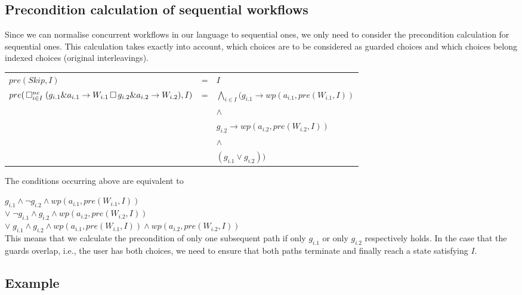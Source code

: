 \documentclass[11pt]{article}
\begin{document}
\subsection{Precondition calculation of sequential workflows}

Since we can normalise concurrent workflows in our language to sequential ones, we only need to consider the precondition calculation for sequential ones. This calculation takes exactly into account, which choices are to be considered as guarded choices and which choices belong indexed choices (original interleavings).

\noindent
\begin{tabular}{l c l}
	$pre(Skip,I)$ & = & $I$ \\
	$pre(\, \Box^{nc}_{i \in I} \; (g_{i.1} \& a_{i.1} \rightarrow W_{i.1} 
                                                \, \Box \, g_{i.2} \& a_{i.2} \rightarrow W_{i.2}),I)$ &=& $\bigwedge_{i \in I} (g_{i.1} \longrightarrow wp(a_{i.1},pre(W_{i.1},I))$ \\ 
&& \hspace*{27pt} $\land$ \\
&& \hspace*{24pt}        $g_{i.2} \longrightarrow wp(a_{i.2},pre(W_{i.2},I))$ \\
&& \hspace*{27pt} $\land$ \\
&& \hspace*{24pt}        $(g_{i.1} \lor g_{i.2}))$
\end{tabular}

The conditions occurring above are equivalent to 

\noindent
\hspace*{7pt} $g_{i.1} \land \lnot g_{i.2} \land wp(a_{i.1},pre(W_{i.1},I))$ \\
$\lor \; \lnot g_{i.1} \land g_{i.2} \land wp(a_{i.2},pre(W_{i.2},I))$ \\
$\lor \; g_{i.1} \land g_{i.2} \land wp(a_{i.1},pre(W_{i.1},I)) \land wp(a_{i.2},pre(W_{i.2},I))$ \\

This means that we calculate the precondition of only one subsequent path if only $g_{i.1}$ or only $g_{i.2}$ respectively holds. In the case that the guards overlap, i.e., the user has both choices, we need to ensure that both paths terminate and finally reach a state satisfying $I$.

\subsection{Example}
\end{document}
